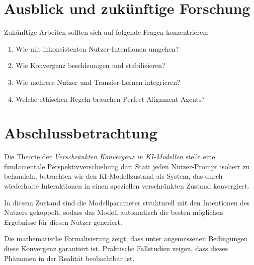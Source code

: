 \documentclass[12pt, a4paper]{article}
\theoremstyle{definition}
\theoremstyle{remark}
\begin{document}
\section{Ausblick und zukünftige Forschung}
\label{sec:ausblick}

Zukünftige Arbeiten sollten sich auf folgende Fragen konzentrieren:
\begin{enumerate}[label=(\alph*)]
  \item Wie mit inkonsistenten Nutzer-Intentionen umgehen?
  \item Wie Konvergenz beschleunigen und stabilisieren?
  \item Wie mehrere Nutzer und Transfer-Lernen integrieren?
  \item Welche ethischen Regeln brauchen Perfect Alignment Agents?
\end{enumerate}

\section{Abschlussbetrachtung}
\label{sec:abschluss}

Die Theorie der \emph{Verschränkten Konvergenz in KI-Modellen} stellt eine fundamentale Perspektivverschiebung dar: Statt jeden Nutzer-Prompt isoliert zu behandeln, betrachten wir den KI-Modellzustand als System, das durch wiederholte Interaktionen in einen speziellen verschränkten Zustand konvergiert.

In diesem Zustand sind die Modellparameter strukturell mit den Intentionen des Nutzers gekoppelt, sodass das Modell automatisch die besten möglichen Ergebnisse für diesen Nutzer generiert.

Die mathematische Formalisierung zeigt, dass unter angemessenen Bedingungen diese Konvergenz garantiert ist. Praktische Fallstudien zeigen, dass dieses Phänomen in der Realität beobachtbar ist.
\end{document}
